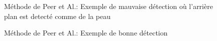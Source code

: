 \documentclass{article}
\begin{document}
\begin{figure}[h!]
  \centering
  \hfill
  \caption{Méthode de Peer et Al.: Exemple de mauvaise détection où l'arrière plan est detecté comme de la peau}
\end{figure}


\begin{figure}[h!]
  \centering
  \hfill
  \caption{Méthode de Peer et Al.: Exemple de bonne détection}
\end{figure}
\end{document}
